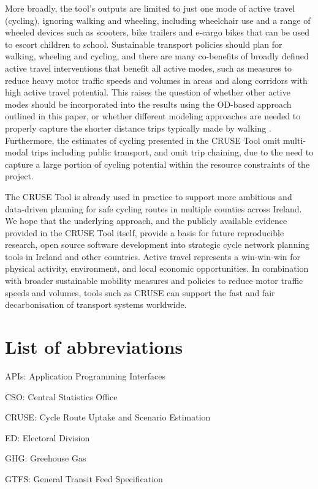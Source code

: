 \documentclass[
  super,
  preprint,
  3p]{elsarticle}
\begin{document}
More broadly, the tool's outputs are limited to just one mode of active
travel (cycling), ignoring walking and wheeling, including wheelchair
use and a range of wheeled devices such as scooters, bike trailers and
e-cargo bikes that can be used to escort children to school. Sustainable
transport policies should plan for walking, wheeling and cycling, and
there are many co-benefits of broadly defined active travel
interventions that benefit all active modes, such as measures to reduce
heavy motor traffic speeds and volumes in areas and along corridors with
high active travel potential. This raises the question of whether other
active modes should be incorporated into the results using the OD-based
approach outlined in this paper, or whether different modeling
approaches are needed to properly capture the shorter distance trips
typically made by walking \citep{cooper2018}. Furthermore, the estimates
of cycling presented in the CRUSE Tool omit multi-modal trips including
public transport, and omit trip chaining, due to the need to capture a
large portion of cycling potential within the resource constraints of
the project.

The CRUSE Tool is already used in practice to support more ambitious and
data-driven planning for safe cycling routes in multiple counties across
Ireland. We hope that the underlying approach, and the publicly
available evidence provided in the CRUSE Tool itself, provide a basis
for future reproducible research, open source software development into
strategic cycle network planning tools in Ireland and other countries.
Active travel represents a win-win-win for physical activity,
environment, and local economic opportunities. In combination with
broader sustainable mobility measures and policies to reduce motor
traffic speeds and volumes, tools such as CRUSE can support the fast and
fair decarbonisation of transport systems worldwide.

\section{List of abbreviations}\label{list-of-abbreviations}

APIs: Application Programming Interfaces

CSO: Central Statistics Office

CRUSE: Cycle Route Uptake and Scenario Estimation

ED: Electoral Division

GHG: Greehouse Gas

GTFS: General Transit Feed Specification
\end{document}
